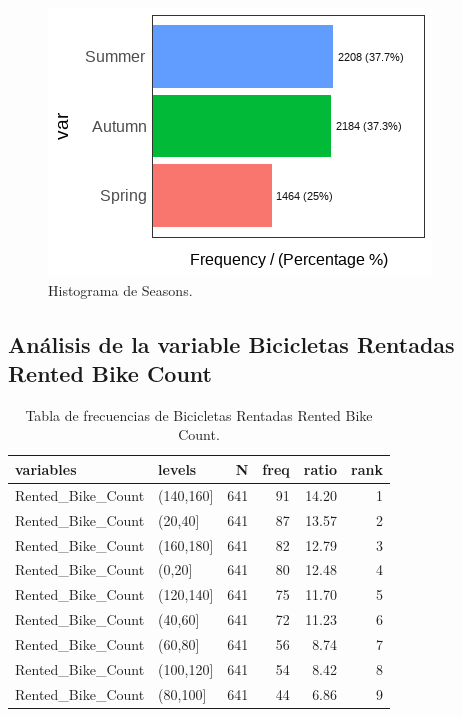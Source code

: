 \documentclass[]{elsarticle} %
\begin{document}
\begin{figure}[H]

{\centering \includegraphics[width=1\linewidth]{barplot_seasons} 

}

\caption{\label{fig:fig1}Histograma de Seasons.}\label{fig:fig1}
\end{figure}

\subsection{Análisis de la variable Bicicletas Rentadas Rented Bike Count}

\newpage
\begin{table}

\caption{\label{tab:tab2}\label{tab:tab2}Tabla de frecuencias de Bicicletas Rentadas Rented Bike Count.}
\centering
\begin{tabular}[t]{l|l|r|r|r|r}
\hline
variables & levels & N & freq & ratio & rank\\
\hline
Rented\_Bike\_Count & (140,160] & 641 & 91 & 14.20 & 1\\
\hline
Rented\_Bike\_Count & (20,40] & 641 & 87 & 13.57 & 2\\
\hline
Rented\_Bike\_Count & (160,180] & 641 & 82 & 12.79 & 3\\
\hline
Rented\_Bike\_Count & (0,20] & 641 & 80 & 12.48 & 4\\
\hline
Rented\_Bike\_Count & (120,140] & 641 & 75 & 11.70 & 5\\
\hline
Rented\_Bike\_Count & (40,60] & 641 & 72 & 11.23 & 6\\
\hline
Rented\_Bike\_Count & (60,80] & 641 & 56 & 8.74 & 7\\
\hline
Rented\_Bike\_Count & (100,120] & 641 & 54 & 8.42 & 8\\
\hline
Rented\_Bike\_Count & (80,100] & 641 & 44 & 6.86 & 9\\
\hline
\end{tabular}
\end{table}
\end{document}
